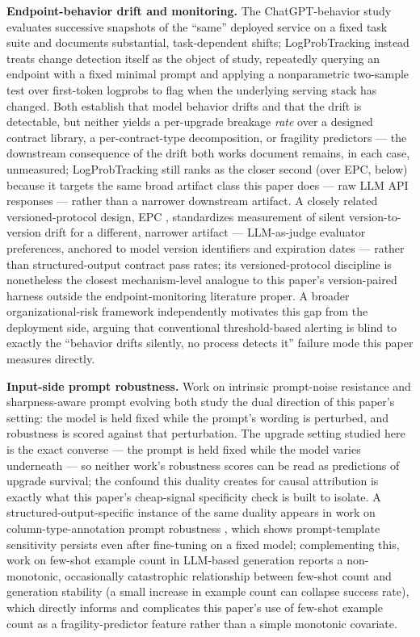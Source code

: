 \documentclass[11pt]{article}
\begin{document}
\textbf{Endpoint-behavior drift and monitoring.} The ChatGPT-behavior study \citep{ChatGPTDrift2307} evaluates successive snapshots of the ``same'' deployed service on a fixed task suite and documents substantial, task-dependent shifts; LogProbTracking \citep{LogProbTracking} instead treats change detection itself as the object of study, repeatedly querying an endpoint with a fixed minimal prompt and applying a nonparametric two-sample test over first-token logprobs to flag when the underlying serving stack has changed. Both establish that model behavior drifts and that the drift is detectable, but neither yields a per-upgrade breakage \emph{rate} over a designed contract library, a per-contract-type decomposition, or fragility predictors --- the downstream consequence of the drift both works document remains, in each case, unmeasured; LogProbTracking still ranks as the closer second (over EPC, below) because it targets the same broad artifact class this paper does --- raw LLM API responses --- rather than a narrower downstream artifact. A closely related versioned-protocol design, EPC \citep{EPCEvaluatorPreference0297}, standardizes measurement of silent version-to-version drift for a different, narrower artifact --- LLM-as-judge evaluator preferences, anchored to model version identifiers and expiration dates --- rather than structured-output contract pass rates; its versioned-protocol discipline is nonetheless the closest mechanism-level analogue to this paper's version-paired harness outside the endpoint-monitoring literature proper. A broader organizational-risk framework \citep{RiskArchitectureAI1421} independently motivates this gap from the deployment side, arguing that conventional threshold-based alerting is blind to exactly the ``behavior drifts silently, no process detects it'' failure mode this paper measures directly.

\textbf{Input-side prompt robustness.} Work on intrinsic prompt-noise resistance and sharpness-aware prompt evolving \citep{CoIPO,TARE} both study the dual direction of this paper's setting: the model is held fixed while the prompt's wording is perturbed, and robustness is scored against that perturbation. The upgrade setting studied here is the exact converse --- the prompt is held fixed while the model varies underneath --- so neither work's robustness scores can be read as predictions of upgrade survival; the confound this duality creates for causal attribution is exactly what this paper's cheap-signal specificity check is built to isolate. A structured-output-specific instance of the same duality appears in work on column-type-annotation prompt robustness \citep{RobustLLMBased2742}, which shows prompt-template sensitivity persists even after fine-tuning on a fixed model; complementing this, work on few-shot example count in LLM-based generation \citep{EnhancingLLMBased4120} reports a non-monotonic, occasionally catastrophic relationship between few-shot count and generation stability (a small increase in example count can collapse success rate), which directly informs and complicates this paper's use of few-shot example count as a fragility-predictor feature rather than a simple monotonic covariate.
\end{document}
